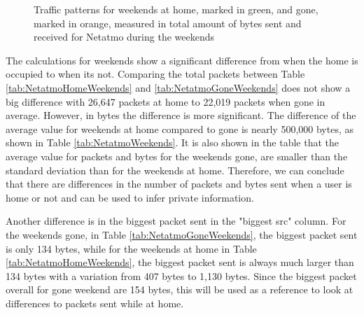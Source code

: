 \begin{figure}[H]
\begin{subfigure}[b]{0.47\textwidth}
    \end{subfigure}
    \begin{subfigure}[b]{0.47\textwidth}
    \end{subfigure}
    \begin{subfigure}[b]{0.47\textwidth}
    \end{subfigure}
   \begin{subfigure}[b]{0.47\textwidth}
    \end{subfigure}
    \hspace{0.6cm}
    \begin{subfigure}[b]{0.47\textwidth}
    \end{subfigure}
    \caption{Traffic patterns for weekends at home, marked in green, and gone, marked in orange, measured in total amount of bytes sent and received for Netatmo during the weekends}
    \label{fig:NetatmoWeekendBytes}
\end{figure}

The calculations for weekends show a significant difference from when the home is occupied to when its not. Comparing the total packets between Table \ref{tab:NetatmoHomeWeekends} and \ref{tab:NetatmoGoneWeekends} does not show a big difference with 26,647 packets at home to 22,019 packets when gone in average. However, in bytes the difference is more significant. The difference of the average value for weekends at home compared to gone is nearly 500,000 bytes, as shown in Table \ref{tab:NetatmoWeekends}. It is also shown in the table that the average value for packets and bytes for the weekends gone, are smaller than the standard deviation than for the weekends at home. Therefore, we can conclude that there are differences in the number of packets and bytes sent when a user is home or not and can be used to infer private information.

Another difference is in the biggest packet sent in the "biggest src" column. For the weekends gone, in Table \ref{tab:NetatmoGoneWeekends}, the biggest packet sent is only 134 bytes, while for the weekends at home in Table \ref{tab:NetatmoHomeWeekends}, the biggest packet sent is always much larger than 134 bytes with a variation from 407 bytes to 1,130 bytes. Since the biggest packet overall for gone weekend are 154 bytes, this will be used as a reference to look at differences to packets sent while at home. 

